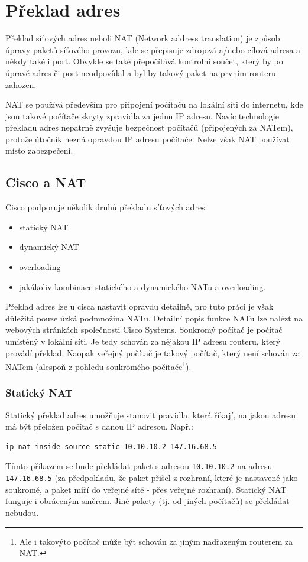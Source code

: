 \section{Překlad adres}

Překlad síťových adres neboli NAT (Network address translation) je způsob úpravy paketů síťového provozu, kde se přepisuje zdrojová a/nebo cílová adresa a někdy také i port. Obvykle se také přepočítává kontrolní součet, který by po úpravě adres či port neodpovídal a byl by takový paket na prvním routeru zahozen.

NAT se používá především pro připojení počítačů na lokální síti do internetu, kde jsou takové počítače skryty zpravidla za jednu IP adresu. Navíc technologie překladu adres nepatrně zvyšuje bezpečnost počítačů (připojených za NATem), protože útočník nezná opravdou IP adresu  počítače. Nelze však NAT používat místo zabezpečení.


\subsection{Cisco a NAT}
Cisco podporuje několik druhů překladu síťových adres:\cite{cisco:druhy}

\begin{itemize}
\item statický NAT
\item dynamický NAT
\item overloading
\item jakákoliv kombinace statického a dynamického NATu a overloading.
\end{itemize}

Překlad adres lze u cisca nastavit opravdu detailně, pro tuto práci je však důležitá pouze úzká podmnožina NATu. Detailní popis funkce NATu lze nalézt na webových stránkách společnosti Cisco Systems\cite{cisco:nat}.
Soukromý počítač je počítač umístěný v lokální síti. Je tedy schován za nějakou IP adresu routeru, který provádí překlad. Naopak veřejný počítač je takový počítač, který není schován za NATem (alespoň z pohledu soukromého počítače\footnote{Ale i takovýto počítač může být schován za jiným nadřazeným routerem za NAT.}).

\subsubsection{Statický NAT}
Statický překlad adres umožňuje stanovit pravidla, která říkají, na jakou adresu má být přeložen počítač s danou IP adresou. Např.:
\begin{verbatim}
ip nat inside source static 10.10.10.2 147.16.68.5
\end{verbatim} 
Tímto příkazem se bude překládat paket s adresou \verb|10.10.10.2| na adresu \verb|147.16.68.5| (za předpokladu, že paket přišel z rozhraní, které je nastavené jako soukromé, a paket míří do veřejné sítě - přes veřejné rozhraní). Statický NAT funguje i obráceným směrem. Jiné pakety (tj. od jiných počítačů) se překládat nebudou. 

